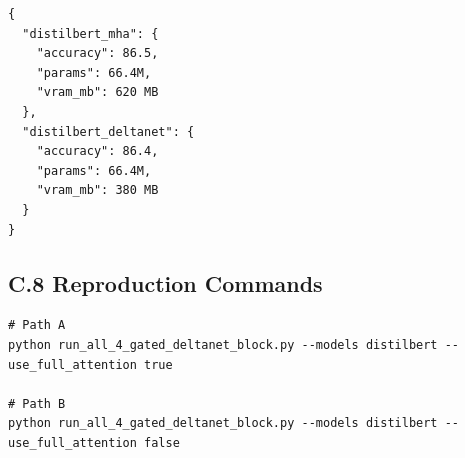 \begin{lstlisting}
{
  "distilbert_mha": {
    "accuracy": 86.5,
    "params": 66.4M,
    "vram_mb": 620 MB
  },
  "distilbert_deltanet": {
    "accuracy": 86.4,
    "params": 66.4M,
    "vram_mb": 380 MB
  }
}
\end{lstlisting}

\subsection{C.8 Reproduction Commands}

\begin{lstlisting}
# Path A
python run_all_4_gated_deltanet_block.py --models distilbert --use_full_attention true

# Path B
python run_all_4_gated_deltanet_block.py --models distilbert --use_full_attention false
\end{lstlisting}

